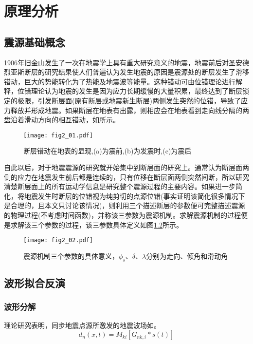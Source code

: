 \chapter{原理分析}

\section{震源基础概念}
1906年旧金山发生了一次在地震学上具有重大研究意义的地震，地震前后对圣安德烈亚斯断层的研究结果\citep{Milne1910}使人们普遍认为发生地震的原因是震源处的断层发生了滑移错动，巨大的势能转化为了热能及地震波等能量。这种错动可由位错理论进行解释，位错理论认为地震的发生是因为应力长期缓慢的大量积累，最终达到了断层锁定的极限，引发断层面(原有断层或地震新生断层)两侧发生突然的位错，导致了应力释放并形成地震。如果断层在地表有出露，则相应会在地表看到走向线分隔的两盘沿着滑动方向的相互错动，如所示。
\begin{figure}
\centering
  \texttt{[image: fig2\_01.pdf]} 
  \caption{断层错动在地表的显现,(a)为震前,(b)为发震时,(c)为震后\citep{Stein2003}}
  \label{fig2_01}
\end{figure}

自此以后，对于地震震源的研究就开始集中到断层面的研究上。通常认为断层面两侧的应力在地震发生前后都是连续的，只有位移在断层面两侧突然间断，所以研究清楚断层面上的所有运动学信息是研究整个震源过程的主要内容。如果进一步简化，将地震发生时断层的位错视为纯剪切的点源位错(事实证明该简化很多情况下是合理的，且本文只讨论该情况)，则利用三个描述断层的参数便可完整描述震源的物理过程(不考虑时间函数)，并称该三参数为震源机制。求解震源机制的过程便是求解该三个参数的过程，该三参数具体定义如图\ref{fig2_02}所示。
\begin{figure}
\centering
  \texttt{[image: fig2\_02.pdf]} 
  \caption{震源机制三个参数的具体意义，$\phi_s$、$\delta$、$\lambda$分别为走向、倾角和滑动角}
  \label{fig2_02}
\end{figure}

\section{波形拟合反演}

\subsection{波形分解}
理论研究表明，同步地震点源\citep{Silver1982}所激发的地震波场如\citep{Jost1989}。
\begin{equation}
\label{eq2_01}
d_n(x,t)=M_{ki}[G_{nk,i}*s(t)]
\end{equation}

